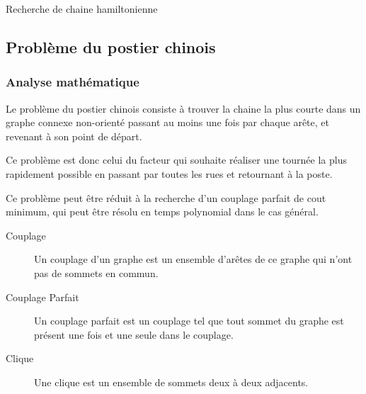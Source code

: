     \begin{algorithm}

      \caption{Recherche de chaine hamiltonienne}
      \label{alg:hamil}
    \end{algorithm}

    
\subsection{Problème du postier chinois}
  \subsubsection{Analyse mathématique}
    Le problème du postier chinois consiste à trouver la chaine la plus courte
    dans un graphe connexe non-orienté passant au moins une fois par chaque
    arête, et revenant à son point de départ.

    Ce problème est donc celui du facteur qui souhaite réaliser une tournée
    la plus rapidement possible en passant par toutes les rues et retournant
    à la poste.

    Ce problème peut être réduit à la recherche d'un couplage parfait de cout
    minimum, qui peut être résolu en temps polynomial dans le cas général.

    \begin{description}
      \item[Couplage] Un couplage d'un graphe est un ensemble d'arêtes de ce
        graphe qui n'ont pas de sommets en commun.
      \item[Couplage Parfait] Un couplage parfait est un couplage tel que tout
        sommet du graphe est présent une fois et une seule dans le couplage.
      \item[Clique] Une clique est un ensemble de sommets deux à deux
        adjacents.
    \end{description}

